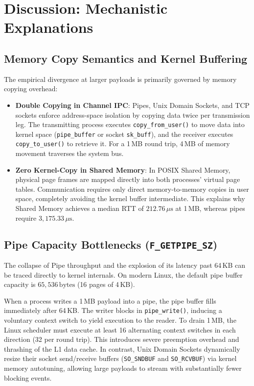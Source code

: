 \documentclass[conference]{IEEEtran}
\begin{document}
\section{Discussion: Mechanistic Explanations}

\subsection{Memory Copy Semantics and Kernel Buffering}
The empirical divergence at larger payloads is primarily governed by memory copying overhead:
\begin{itemize}
    \item \textbf{Double Copying in Channel IPC}: Pipes, Unix Domain Sockets, and TCP sockets enforce address-space isolation by copying data twice per transmission leg. The transmitting process executes \texttt{copy\_from\_user()} to move data into kernel space (\texttt{pipe\_buffer} or socket \texttt{sk\_buff}), and the receiver executes \texttt{copy\_to\_user()} to retrieve it. For a 1\,MB round trip, 4\,MB of memory movement traverses the system bus.
    \item \textbf{Zero Kernel-Copy in Shared Memory}: In POSIX Shared Memory, physical page frames are mapped directly into both processes' virtual page tables. Communication requires only direct memory-to-memory copies in user space, completely avoiding the kernel buffer intermediate. This explains why Shared Memory achieves a median RTT of $212.76\,\mu\text{s}$ at 1\,MB, whereas pipes require $3,175.33\,\mu\text{s}$.
\end{itemize}

\subsection{Pipe Capacity Bottlenecks (\texttt{F\_GETPIPE\_SZ})}
The collapse of Pipe throughput and the explosion of its latency past 64\,KB can be traced directly to kernel internals. On modern Linux, the default pipe buffer capacity is $65,536\,\text{bytes}$ (16 pages of 4\,KB). 

When a process writes a 1\,MB payload into a pipe, the pipe buffer fills immediately after 64\,KB. The writer blocks in \texttt{pipe\_write()}, inducing a voluntary context switch to yield execution to the reader. To drain 1\,MB, the Linux scheduler must execute at least 16 alternating context switches in each direction (32 per round trip). This introduces severe preemption overhead and thrashing of the L1 data cache. In contrast, Unix Domain Sockets dynamically resize their socket send/receive buffers (\texttt{SO\_SNDBUF} and \texttt{SO\_RCVBUF}) via kernel memory autotuning, allowing large payloads to stream with substantially fewer blocking events.
\end{document}
